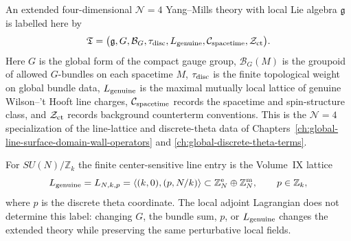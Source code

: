 \begin{definition}[Extended \(\mathcal N=4\) theory label]
\label{def:n4-extended-theory-label}
An extended four-dimensional \(\mathcal N=4\) Yang--Mills theory with local
Lie algebra \(\mathfrak g\) is labelled here by
\[
  \mathfrak T
  =
  \bigl(
    \mathfrak g,G,\mathcal B_G,\tau_{\rm disc},
    L_{\rm genuine},\mathcal C_{\rm spacetime},\mathcal Z_{\rm ct}
  \bigr).
\]
Here \(G\) is the global form of the compact gauge group,
\(\mathcal B_G(M)\) is the groupoid of allowed \(G\)-bundles on each
spacetime \(M\), \(\tau_{\rm disc}\) is the finite topological weight on
global bundle data, \(L_{\rm genuine}\) is the maximal mutually local lattice
of genuine Wilson--'t Hooft line charges, \(\mathcal C_{\rm spacetime}\)
records the spacetime and spin-structure class, and \(\mathcal Z_{\rm ct}\)
records background counterterm conventions.  This is the
\(\mathcal N=4\) specialization of the line-lattice and discrete-theta data of
Chapters~\ref{ch:global-line-surface-domain-wall-operators} and
\ref{ch:global-discrete-theta-terms}.

For \(SU(N)/\mathbb Z_k\) the finite center-sensitive line entry is the
Volume~IX lattice
\[
  L_{\rm genuine}=L_{N,k,p}
  =
  \langle(k,0),(p,N/k)\rangle
  \subset \mathbb Z_N^{\rm e}\oplus\mathbb Z_N^{\rm m},
  \qquad p\in\mathbb Z_k,
\]
where \(p\) is the discrete theta coordinate.  The local adjoint Lagrangian
does not determine this label: changing \(G\), the bundle sum, \(p\), or
\(L_{\rm genuine}\) changes the extended theory while preserving the same
perturbative local fields.
\end{definition}

